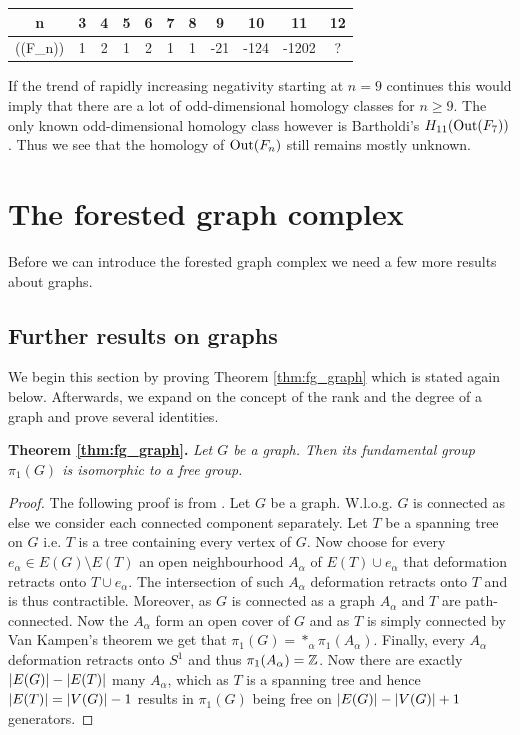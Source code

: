 \begin{table}[htpb]
	\centering
	\begin{tabular}{C|C|C|C|C|C|C|C|C|C|C}
		n & 3 & 4 & 5 & 6 & 7 & 8 & 9 & 10 & 11 & 12\\ \hline
		\chi(\out(F_{n})) & 1 & 2 & 1 & 2 & 1 & 1 & -21 & -124 & -1202 & ?
	\end{tabular}
\end{table}
If the trend of rapidly increasing negativity starting at $n=9$ continues this would imply that there are a lot of odd-dimensional homology classes for $n \geq 9$.
The only known odd-dimensional homology class however is Bartholdi's $H_{11}(\operatorname{Out}(F_{7}))$.
Thus we see that the homology of $\operatorname{Out}(F_{n})$ still remains mostly unknown.

\newpage
\section{The forested graph complex}
Before we can introduce the forested graph complex we need a few more results about graphs.
\subsection{Further results on graphs}
\label{sec:RankGraph}
We begin this section by proving Theorem \ref{thm:fg_graph} which is stated again below.
Afterwards, we expand on the concept of the rank and the degree of a graph and prove several identities.

\textbf{Theorem \ref{thm:fg_graph}.} \textit{Let $G$ be a graph. Then its fundamental group $\pi_{1}(G)$ is isomorphic to a free group.}

\begin{proof}
	The following proof is from \cite[p. 43f.]{hatcher00}.
	Let $G$ be a graph. W.l.o.g. $G$ is connected as else we consider each connected component separately. 
	Let $T$ be a spanning tree on $G$ i.e. $T$ is a tree containing every vertex of $G$.
	Now choose for every $e_{\alpha} \in E(G) \setminus E(T)$ an open neighbourhood $A_{\alpha}$ of $E(T) \cup e_{\alpha}$ that deformation retracts onto $T \cup e_{\alpha}$.
	The intersection of such $A_{\alpha}$ deformation retracts onto $T$ and is thus contractible. 
	Moreover, as $G$ is connected as a graph $A_{\alpha}$ and $T$ are path-connected.
	Now the $A_{\alpha}$ form an open cover of $G$ and as $T$ is simply connected by Van Kampen's theorem we get that $\pi_{1}(G) = *_{\alpha} \pi_{1}(A_{\alpha})$.
	Finally, every $A_{\alpha}$ deformation retracts onto $S^{1}$ and thus $\pi_{1}(A_{\alpha}) = \mathbb{Z}$. Now there are exactly $\abs{E(G)} - \abs{E(T)}$ many $A_{\alpha}$,
	which as $T$ is a spanning tree and hence $\abs{E(T)} = \abs{V(G)}-1$ results in $\pi_1(G)$ being free on $\abs{E(G)} - \abs{V(G)} + 1$ generators.
\end{proof}

